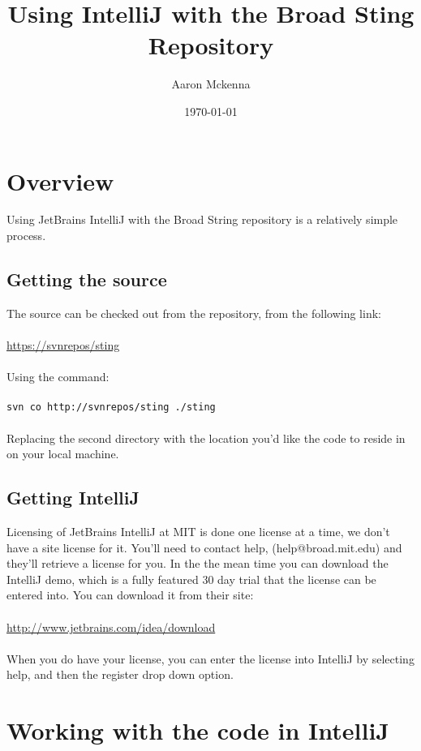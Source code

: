 \documentclass[11pt,fullpage]{article}
\begin{document}
\title{Using IntelliJ with the Broad Sting Repository}
\author{Aaron Mckenna}
\date{\today}
\maketitle

\section{Overview}
Using JetBrains IntelliJ with the Broad String repository is a relatively simple process.  

\subsection{Getting the source}
The source can be checked out from the repository, from the following link: \\ \\
\url{https://svnrepos/sting}\\ \\
Using the command:\\ \\
\texttt{svn co http://svnrepos/sting ./sting} \\ \\ 
Replacing the second directory with the location you'd like the code to reside in on your local machine.  
\subsection{Getting IntelliJ}
Licensing of JetBrains IntelliJ at MIT is done one license at a time, we don't have a site license for it.  You'll need to contact help,
(help@broad.mit.edu) and they'll retrieve a license for you.  In the the mean time you can download the IntelliJ demo, which is a 
fully featured 30 day trial that the license can be entered into.  You can download it from their site: \\ \\
\url{http://www.jetbrains.com/idea/download} \\ \\
When you do have your license, you can enter the license into IntelliJ by selecting help, and then the register drop down option. 
\section{Working with the code in IntelliJ}
\end{document}

